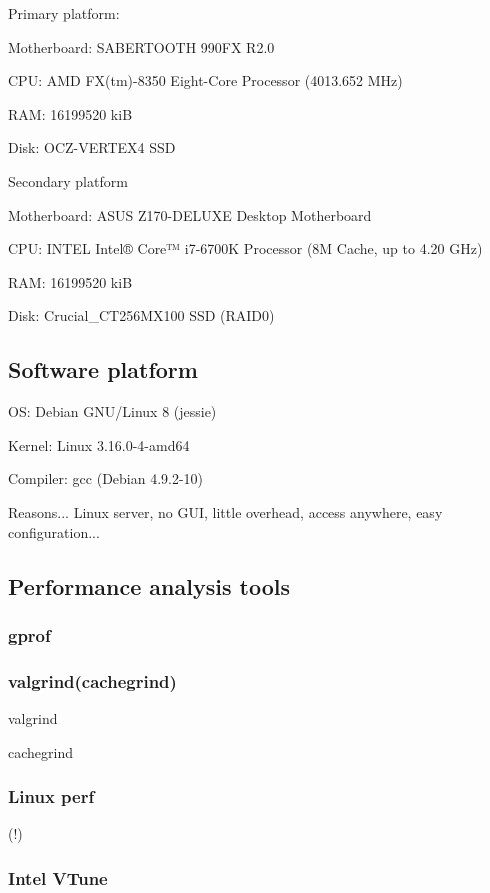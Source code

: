 \documentclass[conference]{IEEEtran}
\begin{document}
Primary platform:

Motherboard:	SABERTOOTH 990FX R2.0

CPU:	AMD FX(tm)-8350 Eight-Core Processor (4013.652 MHz)

RAM:	16199520 kiB

Disk:	OCZ-VERTEX4 SSD


Secondary platform

Motherboard:	ASUS Z170-DELUXE Desktop Motherboard

CPU:	INTEL Intel® Core™ i7-6700K Processor (8M Cache, up to 4.20 GHz)

RAM:	16199520 kiB

Disk:	Crucial\_CT256MX100 SSD (RAID0)
\subsection{Software platform}

OS:	Debian GNU/Linux 8 (jessie)

Kernel:	Linux 3.16.0-4-amd64

Compiler:	gcc (Debian 4.9.2-10)

Reasons... Linux server, no GUI, little overhead, access anywhere, easy configuration...

\subsection{Performance analysis tools}

\subsubsection{gprof}

\cite{graham1982gprof}

\subsubsection{valgrind(cachegrind)}

valgrind \cite{nethercote2003valgrind}

cachegrind \cite{seward2004cachegrind}

\subsubsection{Linux perf}

\cite{de2010new}

(!)

\subsubsection{Intel VTune}
\end{document}
